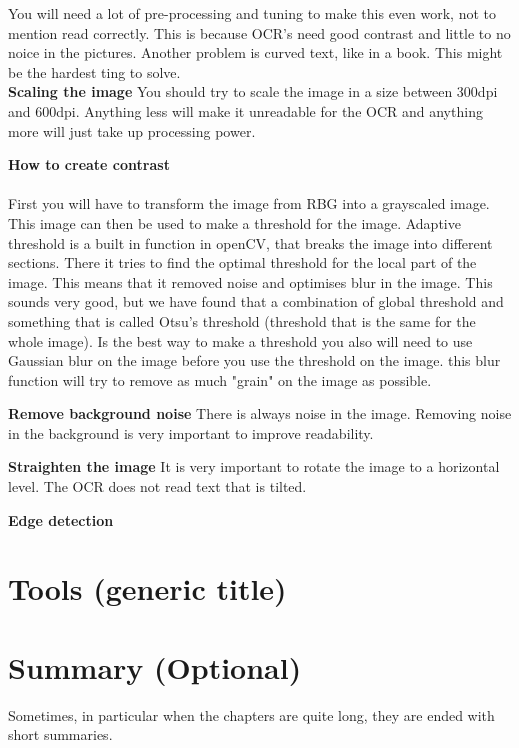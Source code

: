 You will need a lot of pre-processing and tuning to make this even work, not to mention read correctly.
This is because OCR's need good contrast and little to no noice in the pictures.
Another problem is curved text, like in a book.
This might be the hardest ting to solve.
\\
\textbf{Scaling the image}
You should try to scale the image in a size between 300dpi and 600dpi.
Anything less will make it unreadable for the OCR and anything more will just take up processing power.

\textbf{How to create contrast}
\\\\

First you will have to transform the image from RBG into a grayscaled image.
This image can then be used to make a threshold for the image.
Adaptive threshold is a built in function in openCV, that breaks the image into different sections.
There it tries to find the optimal threshold for the local part of the image.
This means that it removed noise and optimises blur in the image.
This sounds very good, but we have found that a combination of global threshold and something that is called Otsu's threshold (threshold that is the same for the whole image).
Is the best way to make a threshold you also will need to use Gaussian blur on the image before you use the threshold on the image.
this blur function will try to remove as much "grain" on the image as possible.

\textbf{Remove background noise}
There is always noise in the image.
Removing noise in the background is very important to improve readability.

\textbf{Straighten the image}
It is very important to rotate the image to a horizontal level.
The OCR does not read text that is tilted.

\textbf{Edge detection}









\section{Tools (generic title)}\label{sec:tools-(generic-title)}


\section{Summary (Optional)}\label{sec:summary-(optional)}

Sometimes, in particular when the chapters are quite long, they are ended with short summaries.
